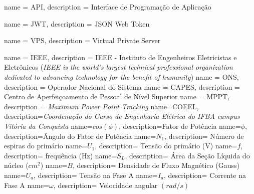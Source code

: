{
  name = {API},
  description = {Interface de Programação de Aplicação}}

{
  name = {JWT},
  description = {JSON Web Token}}

{
  name = {VPS},
  description = {Virtual Private Server}}


{
  name = {IEEE},
  description = {IEEE - Instituto de 
      Engenheiros Eletricistas e Eletrônicos (\textit{IEEE is the world's largest technical professional organization dedicated to advancing technology for the benefit of humanity})}
}
{
  name = {ONS},
  description = {Operador Nacional do 
      Sistema}
}
{
   name = {CAPES},
   description = {Centro de Aperfeiçoamento 
       de Pessoal de Nível Superior}
}
{
   name = {MPPT},
   description = {\textit{Maximum Power 
       Point Tracking}}
}
{
   name={COEEL},
   description={\textit{Coordenação do Curso de Engenharia Elétrica do IFBA campus Vitória da Conquista}}
}
%
%
{
   name={$cos(\phi)$},
   description={Fator de Potência}
}
{
   name={$\phi$},
   description={Ângulo do Fator de Potência}
}
{
   name={$N_1$},
   description= Número de espiras do primário
}
{
   name={$U_1$},
   description= Tensão do primário (V)
}
{
   name={$f$},
   description= frequência (Hz)
}
{
   name={$S_L$},
   description= Área da Seção Líquida do núcleo ($cm^2$)
}
{
   name={$B$},
   description= Densidade de Fluxo Magnético (Gauss)
}
{
   name={$U_a$},
   description= Tensão na Fase A
}
{
   name={$I_a$},
   description= Corrente na Fase A
}
{
   name={$\omega$},
   description= Velocidade angular $(rad/s)$ 
}



